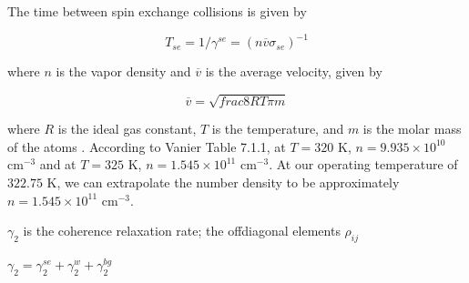 The time between spin exchange collisions is given by

\begin{equation}
T_{se} = 1/\gamma^{se} = (n\overline{v}\sigma_{se})^{-1}
\end{equation}

where $n$ is the vapor density and $\overline{v}$ is the average velocity, given by

\begin{equation}
\overline{v} = \sqrt{frac{8RT}{\pi m}}
\end{equation}

where $R$ is the ideal gas constant, $T$ is the temperature, and $m$
is the molar mass of the atoms \cite{vanier}. According to Vanier
Table 7.1.1, at $T = 320$ K, $n = 9.935\times 10^{10}$ cm$^{-3}$ and
at $T = 325$ K, $n = 1.545\times 10^{11}$ cm$^{-3}$. At our operating
temperature of $322.75$ K, we can extrapolate the number density to be
approximately  $n = 1.545\times 10^{11}$ cm$^{-3}$. 


$\gamma_2$ is the coherence relaxation rate; the offdiagonal elements $\rho_{ij}$

$\gamma_2 = \gamma_2^{se} + \gamma_2^{w} + \gamma_2^{bg} $

